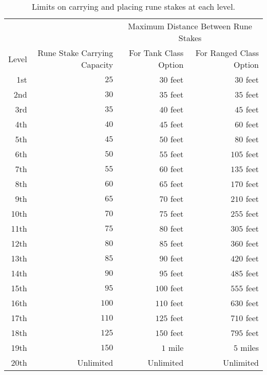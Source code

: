 \begin{table}
\center
\begin{tabular}{r | r | r r }
\toprule
\multicolumn{2}{c}{} & \multicolumn{2}{c}{Maximum Distance Between Rune Stakes} \\
Level & Rune Stake Carrying Capacity & For Tank Class Option & For Ranged Class Option \\
\midrule
1st  & $25$ & $30$ feet & $30$ feet \\
2nd  & $30$ & $35$ feet & $35$ feet \\
3rd  & $35$ & $40$ feet & $45$ feet \\
4th  & $40$ & $45$ feet & $60$ feet \\
5th  & $45$ & $50$ feet & $80$ feet \\
6th  & $50$ & $55$ feet & $105$ feet \\
7th  & $55$ & $60$ feet & $135$ feet \\
8th  & $60$ & $65$ feet & $170$ feet \\
9th  & $65$ & $70$ feet & $210$ feet \\
10th & $70$ & $75$ feet & $255$ feet \\
11th & $75$ & $80$ feet & $305$ feet \\
12th & $80$ & $85$ feet & $360$ feet \\
13th & $85$ & $90$ feet & $420$ feet \\
14th & $90$ & $95$ feet & $485$ feet \\
15th & $95$ & $100$ feet & $555$ feet \\
16th & $100$ & $110$ feet & $630$ feet \\
17th & $110$ & $125$ feet & $710$ feet \\
18th & $125$ & $150$ feet & $795$ feet \\
19th & $150$ & $1$ mile & $5$ miles \\
20th & Unlimited & Unlimited & Unlimited \\
\bottomrule
\end{tabular}
\label{table:class-spellbinding-limits}
\caption{Limits on carrying and placing rune stakes at each level.}
\end{table}

